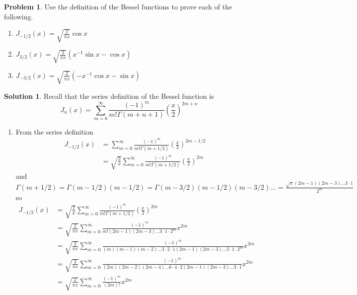 \documentclass[10pt]{article}
\theoremstyle{definition}
\newtheorem{problem}{Problem}
\newtheorem{soln}{Solution}
\begin{document}
\begin{problem} Use the definition of the Bessel functions to prove each of the following.
\begin{enumerate}[label=(\alph*)]
  \item $\displaystyle J_{-1/2}(x)=\sqrt{\frac{2}{\pi x}}\cos x$
  \item $\displaystyle J_{3/2}(x)=\sqrt{\frac{2}{\pi x}}\left(x^{-1}\sin x-\cos x\right)$
  \item $\displaystyle J_{-3/2}(x)=\sqrt{\frac{2}{\pi x}}\left(-x^{-1}\cos x-\sin x\right)$
\end{enumerate}
\end{problem}
\begin{soln} Recall that the series definition of the Bessel function is
  $$J_n(x) = \sum_{m=0}^\infty \frac{(-1)^m}{m!\Gamma(m+n+1)} {\left(\frac{x}{2}\right)}^{2m + n}$$
  \begin{enumerate}[label=(\alph*)]
    \item From the series definition
          \begin{align*}
            J_{-1/2}(x) & = \sum_{m=0}^\infty \frac{(-1)^m}{m!\Gamma(m+1/2)} {\left(\frac{x}{2}\right)}^{2m - 1/2}             \\
                        & = \sqrt{\frac{2}{x}}\sum_{m=0}^\infty \frac{(-1)^m}{m!\Gamma(m+1/2)} {\left(\frac{x}{2}\right)}^{2m}
          \end{align*}
          and $\Gamma(m+1/2)=\Gamma(m-1/2)(m-1/2)=\Gamma(m-3/2)(m-1/2)(m-3/2)\dots =\frac{\sqrt{\pi}(2m-1)(2m-3)\dots 3\cdot 1}{2^m}$ so
          \begin{align*}
            J_{-1/2}(x) & = \sqrt{\frac{2}{x}}\sum_{m=0}^\infty \frac{(-1)^m}{m!\Gamma(m+1/2)} {\left(\frac{x}{2}\right)}^{2m}                                 \\
                        & = \sqrt{\frac{2}{\pi x}}\sum_{m=0}^\infty \frac{(-1)^m}{m! (2m-1)(2m-3)\dots 3\cdot 1\cdot 2^m} x^{2m}                               \\
                        & = \sqrt{\frac{2}{\pi x}}\sum_{m=0}^\infty \frac{(-1)^m}{(m)(m-1)(m-2)\dots 3\cdot2\cdot1 (2m-1)(2m-3)\dots 3\cdot 1\cdot 2^m} x^{2m} \\
                        & = \sqrt{\frac{2}{\pi x}}\sum_{m=0}^\infty \frac{(-1)^m}{(2m)(2m-2)(2m-4)\dots 6\cdot 4\cdot 2 (2m-1)(2m-3)\dots 3\cdot 1} x^{2m}     \\
                        & = \sqrt{\frac{2}{\pi x}}\sum_{m=0}^\infty \frac{(-1)^m}{(2m)!} x^{2m}                                                                \\

\end{align*}
\end{enumerate}
\end{soln}
\end{document}
